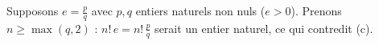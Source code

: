 \begin{description}
\begin{enumerate}
\begin{enumerate}
				Supposons $e = \frac{p}{q}$ avec $p, q$ entiers naturels non nuls ($e > 0$). Prenons $n \geq \max(q, 2)$ :
				$n!\, e = n!\, \frac{p}{q}$ serait un entier naturel, ce qui contredit (c).
				\par\noindent{}
		\end{enumerate}
	\end{enumerate}
\end{description}

